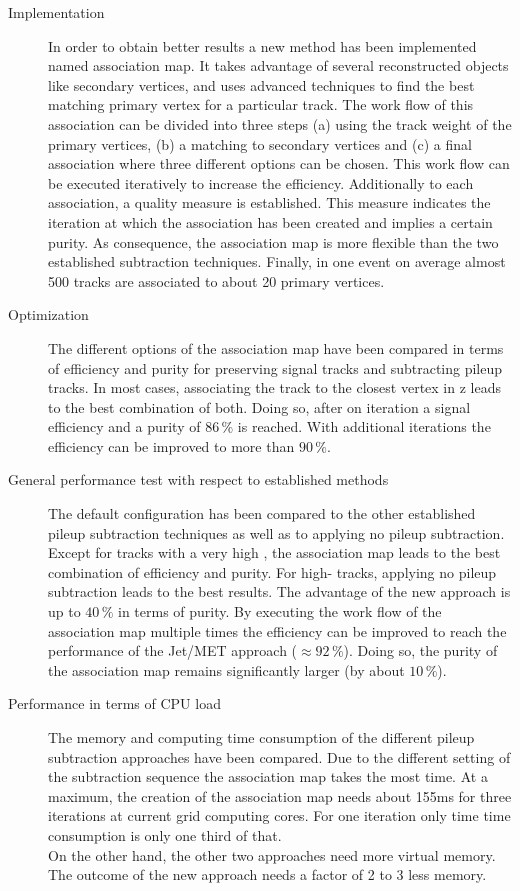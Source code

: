 \begin{description}

\item[Implementation] In order to obtain better results a new method has been implemented named association map. It takes advantage of several reconstructed objects like secondary vertices, and uses advanced techniques to find the best matching primary vertex for a particular track. The work flow of this association can be divided into three steps (a) using the track weight of the primary vertices, (b) a matching to secondary vertices and (c) a final association where three different options can be chosen. This work flow can be executed iteratively to increase the efficiency. Additionally to each association, a quality measure is established. This measure indicates the iteration at which the association has been created and implies a certain purity. As consequence, the association map is more flexible than the two established subtraction techniques. Finally, in one event on average almost 500 tracks are associated to about 20 primary vertices.

\item[Optimization] The different options of the association map have been compared in terms of efficiency and purity for preserving signal tracks and subtracting pileup tracks. In most cases, associating the track to the closest vertex in z leads to the best combination of both. Doing so, after on iteration a signal efficiency and a purity of $86\,\%$ is reached. With additional iterations the efficiency can be improved to more than $90\,\%$.

\item[General performance test with respect to established methods] The default configuration has been compared to the other established pileup subtraction techniques as well as to applying no pileup subtraction. Except for tracks with a very high \pt{}, the association map leads to the best combination of efficiency and purity. For high-\pt{} tracks, applying no pileup subtraction leads to the best results. The advantage of the new approach is up to $40\,\%$ in terms of purity. By executing the work flow of the association map multiple times the efficiency can be improved to reach the performance of the Jet/MET approach ($\approx92\,\%$). Doing so, the purity of the association map remains significantly larger (by about $10\,\%$).

\item[Performance in terms of CPU load] The memory and computing time consumption of the different pileup subtraction approaches have been compared. Due to the different setting of the subtraction sequence the association map takes the most time. At a maximum, the creation of the association map needs about 155\unit{ms} for three iterations at current grid computing cores. For one iteration only time time consumption is only one third of that. \\
On the other hand, the other two approaches need more virtual memory. The outcome of the new approach needs a factor of 2 to 3 less memory.


\end{description}

